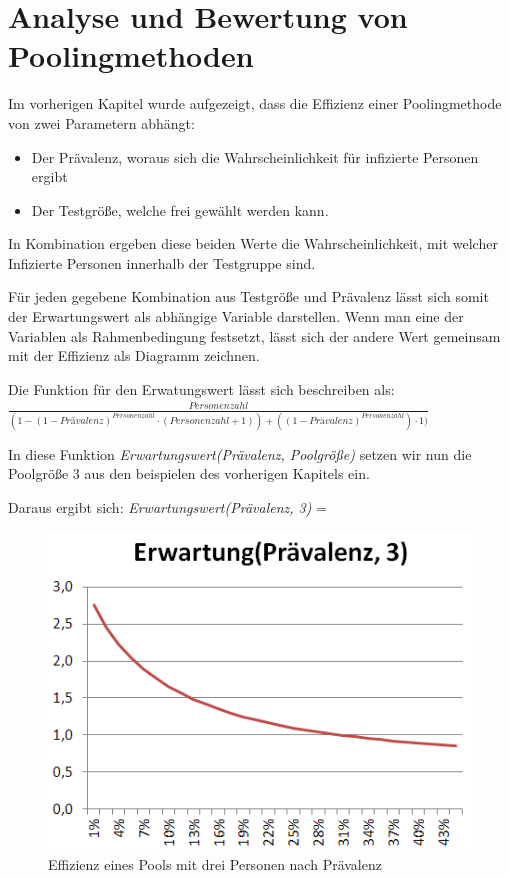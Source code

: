 \chapter{Analyse und Bewertung von Poolingmethoden}
Im vorherigen Kapitel wurde aufgezeigt, dass die Effizienz einer Poolingmethode von zwei Parametern abhängt:
\begin{itemize}
	\item Der Prävalenz, woraus sich die Wahrscheinlichkeit für infizierte Personen ergibt
	\item Der Testgröße, welche frei gewählt werden kann.
\end{itemize}
In Kombination ergeben diese beiden Werte die Wahrscheinlichkeit, mit welcher Infizierte Personen innerhalb der Testgruppe sind.

Für jeden gegebene Kombination aus Testgröße und Prävalenz lässt sich somit der Erwartungswert als abhängige Variable darstellen.
Wenn man eine der Variablen als Rahmenbedingung festsetzt, lässt sich der andere Wert gemeinsam mit der Effizienz als Diagramm zeichnen.

Die Funktion für den Erwatungswert lässt sich beschreiben als:
$\frac{Personenzahl}{(1 - (1-Prävalenz)^{Personenzahl} \cdot (Personenzahl + 1)) + ((1-Prävalenz)^{Personenzahl}) \cdot 1)}$

In diese Funktion \textit{Erwartungswert(Prävalenz, Poolgröße)} setzen wir nun die Poolgröße 3 aus den beispielen des vorherigen Kapitels ein.

Daraus ergibt sich: \textit{Erwartungswert(Prävalenz, 3)} = 
\begin{figure}
	\includegraphics[width=.5\textwidth]{img/ErwartungEindim3}
	\caption{Effizienz eines Pools mit drei Personen nach Prävalenz}
\end{figure}

